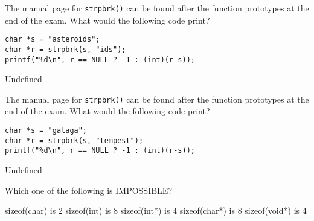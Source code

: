 \variant
The manual page for {\tt strpbrk()} can be found after the function prototypes at
the end of the exam.  What would the following code print?
\begin{verbatim}
char *s = "asteroids";
char *r = strpbrk(s, "ids");
printf("%d\n", r == NULL ? -1 : (int)(r-s));
\end{verbatim}
\begin{answers}
\answer Undefined
\end{answers}
\begin{solution}
\end{solution}

\variant
The manual page for {\tt strpbrk()} can be found after the function prototypes at
the end of the exam.  What would the following code print?
\begin{verbatim}
char *s = "galaga";
char *r = strpbrk(s, "tempest");
printf("%d\n", r == NULL ? -1 : (int)(r-s));
\end{verbatim}
\begin{answers}
\answer Undefined
\end{answers}
\begin{solution}
\end{solution}






\variant
Which one of the following is IMPOSSIBLE?
\begin{answers}
\correctanswer sizeof(char) is 2
\answer sizeof(int) is 8
\answer sizeof(int*) is 4
\answer sizeof(char*) is 8
\answer sizeof(void*) is 4
\end{answers}
\begin{solution}
\end{solution}


